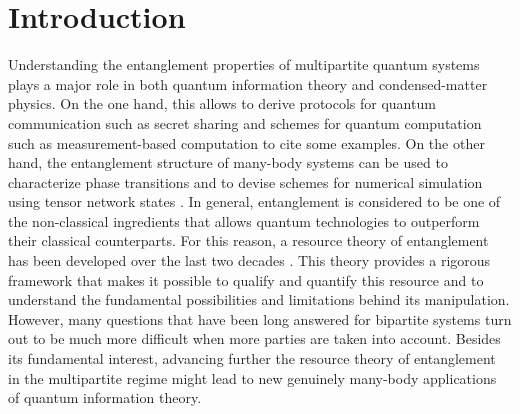 \documentclass[superscriptaddress,twocolumn]{revtex4}\usepackage[utf8]{inputenc}
\begin{document}
\maketitle

\section{Introduction}
Understanding the entanglement properties of multipartite quantum systems plays a major role in both quantum information theory and condensed-matter physics. On the one hand, this allows to derive protocols for quantum communication such as secret sharing \cite{SecretSh} and schemes for quantum computation such as measurement-based computation \cite{RaBr01} to cite some examples. On the other hand, the entanglement structure of many-body systems can be used to characterize phase transitions \cite{AmFa08} and to devise schemes for numerical simulation using tensor network states \cite{orus}. In general, entanglement is considered to be one of the non-classical ingredients that allows quantum technologies to outperform their classical counterparts. For this reason, a resource theory of entanglement has been developed over the last two decades \cite{review}. This theory provides a rigorous framework that makes it possible to qualify and quantify this resource and to understand the fundamental possibilities and limitations behind its manipulation. However, many questions that have been long answered for bipartite systems turn out to be much more difficult when more parties are taken into account. Besides its fundamental interest, advancing further the resource theory of entanglement in the multipartite regime might lead to new genuinely many-body applications of quantum information theory.
\end{document}
